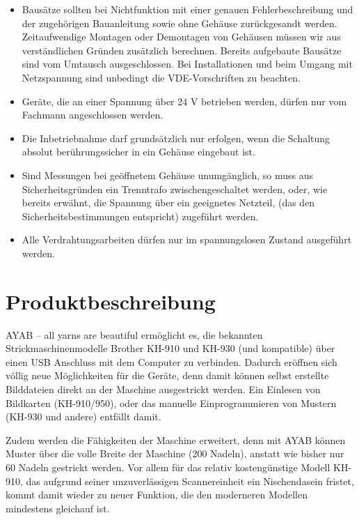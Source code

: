 \documentclass[fleqn,10pt]{SelfArx} %
\begin{document}
\begin{itemize}[noitemsep]
\item Bausätze sollten bei Nichtfunktion mit einer genauen Fehlerbeschreibung und der zugehörigen Bauanleitung sowie ohne Gehäuse zurückgesandt werden. Zeitaufwendige Montagen oder Demontagen von Gehäusen müssen wir aus verständlichen Gründen zusätzlich berechnen. Bereits aufgebaute Bausätze sind vom Umtausch ausgeschlossen. Bei Installationen und beim Umgang mit Netzspannung sind unbedingt die VDE-Vorschriften zu beachten.
\item Geräte, die an einer Spannung über 24 V betrieben werden, dürfen nur vom Fachmann angeschlossen werden.
\item Die Inbetriebnahme darf grundsätzlich nur erfolgen, wenn die Schaltung absolut berührungssicher in ein Gehäuse eingebaut ist.
\item Sind Messungen bei geöffnetem Gehäuse unumgänglich, so muss aus Sicherheitsgründen ein Trenntrafo zwischengeschaltet werden, oder, wie bereits erwähnt, die Spannung über ein geeignetes Netzteil, (das den Sicherheitsbestimmungen entspricht) zugeführt werden.
\item Alle Verdrahtungsarbeiten dürfen nur im spannungslosen Zustand ausgeführt werden.

\end{itemize}


\section{Produktbeschreibung}

AYAB – all yarns are beautiful ermöglicht es, die bekannten Strickmaschinenmodelle Brother KH-910 und KH-930 (und kompatible) über einen USB Anschluss mit dem Computer zu verbinden. Dadurch eröffnen sich völlig neue Möglichkeiten für die Geräte, denn damit können selbst erstellte Bilddateien direkt an der Maschine ausgestrickt werden. Ein Einlesen von Bildkarten (KH-910/950), oder das manuelle Einprogrammieren von Mustern (KH-930 und andere) entfällt damit.

Zudem werden die Fähigkeiten der Maschine erweitert, denn mit AYAB können Muster über die volle Breite der Maschine (200 Nadeln), anstatt wie bisher nur 60 Nadeln gestrickt werden.
Vor allem für das relativ kostengünstige Modell KH-910, das aufgrund seiner unzuverlässigen Scannereinheit ein Nischendasein fristet, kommt damit wieder zu neuer Funktion, die den moderneren Modellen mindestens gleichauf ist.
\end{document}
